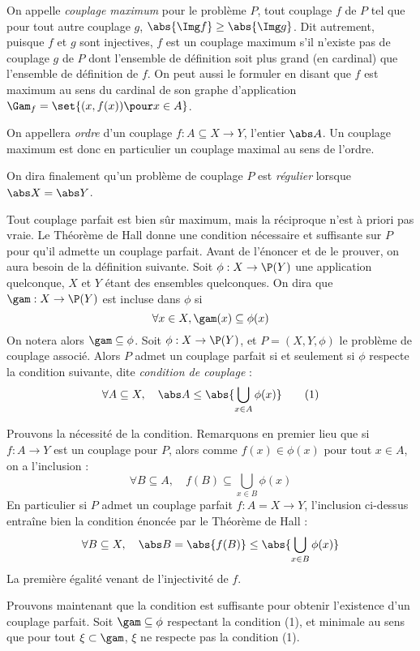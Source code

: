 On appelle \emph{couplage maximum} pour le problème $P$, tout couplage $f$ de $P$ tel que pour tout autre couplage $g$, $\abs{\Img f} \geq \abs{\Img g}$. Dit autrement, puisque $f$ et $g$ sont injectives, $f$ est un couplage maximum s'il n'existe pas de couplage $g$ de $P$ dont l'ensemble de définition soit plus grand (en cardinal) que l'ensemble de définition de $f$. On peut aussi le formuler en disant que $f$ est maximum au sens du cardinal de son graphe d'application $\Gam_f = \set{(x,f(x)) \pour x \in A}$.

On appellera \emph{ordre} d'un couplage $f : A \subseteq X \to Y$, l'entier $\abs A$. Un couplage maximum est donc en particulier un couplage maximal au sens de l'ordre.

On dira finalement qu'un problème de couplage $P$ est \emph{régulier} lorsque $\abs X = \abs Y$.
\SEP

Tout couplage parfait est bien sûr maximum, mais la réciproque n'est à priori pas vraie. Le Théorème de Hall donne une condition nécessaire et suffisante sur $P$ pour qu'il admette un couplage parfait. Avant de l'énoncer et de le prouver, on aura besoin de la définition suivante.
\SEP\jdefi Soit $\phi : X \to \P (Y)$ une application quelconque, $X$ et $Y$ étant des ensembles quelconques. On dira que $\gam : X \to \P (Y)$ est incluse dans $\phi$ si
\[ \forall x \in X, \gam(x) \subseteq \phi(x) \]
On notera alors $\gam \subseteq \phi$.
\SEP{} Soit $\phi : X \to \P(Y)$, et $P = (X,Y,\phi)$ le problème de couplage associé. Alors $P$ admet un couplage parfait si et seulement si $\phi$ respecte la condition suivante, dite \emph{condition de couplage} :
\[ \forall A \subseteq X, \quad \abs A \leq \abs{ \bigcup _{x \in A} \phi(x) } \tag{1} \]
\SEP\jpreuve

    Prouvons la nécessité de la condition. Remarquons en premier lieu que si $f : A \to Y $ est un couplage pour $P$, alors comme $f(x) \in \phi(x)$ pour tout $x \in A$, on a l'inclusion :
    \[ \forall B \subseteq A, \quad f(B) \subseteq \bigcup _{x \in B} \phi(x) \]
    En particulier si $P$ admet un couplage parfait $f : A = X \to Y$, l'inclusion ci-dessus entraîne bien la condition énoncée par le Théorème de Hall :
    \[ \forall B \subseteq X, \quad \abs B = \abs{f(B)} \leq \abs{ \bigcup _{x \in B} \phi(x) } \]
    La première égalité venant de l'injectivité de $f$.
    \medskip
    
    Prouvons maintenant que la condition est suffisante pour obtenir l'existence d'un couplage parfait. Soit $\gam \subseteq \phi$ respectant la condition (1), et minimale au sens que pour tout $\xi \subset \gam$, $\xi$ ne respecte pas la condition (1).
    
